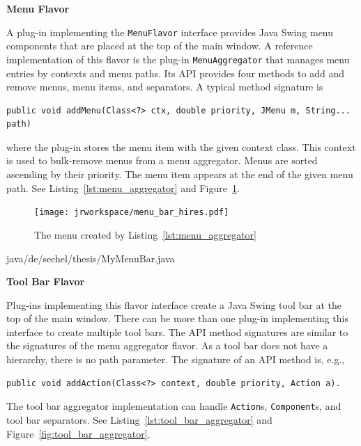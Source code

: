\documentclass[Thesis.tex]{subfiles}
\begin{document}
{\bf Menu Flavor}

A plug-in implementing the {\tt MenuFlavor} interface provides {\sc Java Swing\TReg} menu 
components that are placed at the top of the main window. A reference implementation of this
flavor is the plug-in {\tt MenuAggregator} that manages menu entries by contexts and
menu paths. Its API provides four methods to add and remove menus, menu items, and
separators. A typical method signature is

\begin{lstlisting}[numbers=none]
	public void addMenu(Class<?> ctx, double priority, JMenu m, String... path)
\end{lstlisting}

where the plug-in stores the menu item with the given context class. This context is used to
bulk-remove menus from a menu aggregator. Menus are sorted ascending
by their priority. The menu item appears at the end of the given menu path. See 
Listing~\ref{lst:menu_aggregator} and Figure~\ref{fig:menu_aggregator}.


\begin{figure}[H]
\centering
\texttt{[image: jrworkspace/menu\_bar\_hires.pdf]}
\caption{The menu created by Listing~\ref{lst:menu_aggregator}}
\label{fig:menu_aggregator}
\end{figure}

 {java/de/sechel/thesis/MyMenuBar.java}

{\bf Tool Bar Flavor}

Plug-ins implementing this flavor interface create a {\sc Java Swing\TReg} tool bar at the top of the 
main window. There can be more than one plug-in implementing this interface to create multiple 
tool bars. The API method signatures are similar to the signatures of the menu aggregator flavor. As 
a tool bar does not have a hierarchy, there is no path parameter. The signature of an API method is, e.g.,

\begin{lstlisting}[numbers=none]
	public void addAction(Class<?> context, double priority, Action a).
\end{lstlisting}

The tool bar aggregator implementation can handle {\tt Action}s, {\tt Component}s, and tool bar
separators. See Listing~\ref{lst:tool_bar_aggregator} and Figure~\ref{fig:tool_bar_aggregator}.
\end{document}
